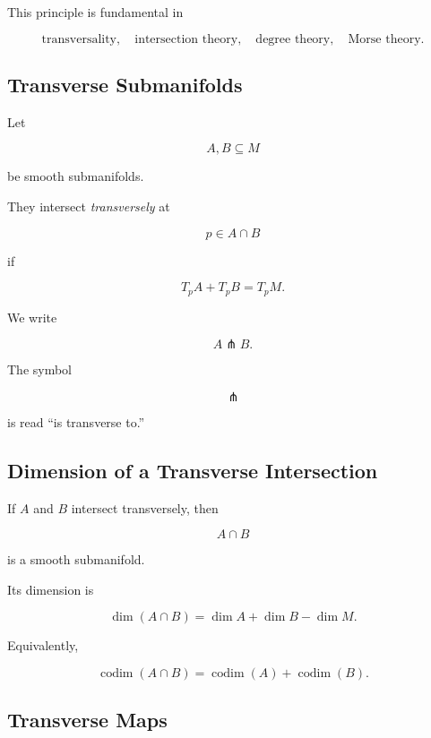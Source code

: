 This principle is fundamental in

\[
\boxed{
\text{transversality},
\quad
\text{intersection theory},
\quad
\text{degree theory},
\quad
\text{Morse theory}.
}
\]

\subsection{Transverse Submanifolds}
\label{subsec:transverse-submanifolds}

Let

\[
A,B\subseteq M
\]

be smooth submanifolds.

They intersect \emph{transversely} at

\[
p\in A\cap B
\]

if

\[
\boxed{
T_pA+T_pB=T_pM.
}
\]

We write

\[
\boxed{
A\pitchfork B.
}
\]

The symbol

\[
\pitchfork
\]

is read ``is transverse to.''

\subsection{Dimension of a Transverse Intersection}
\label{subsec:dimension-transverse-intersection}

If \(A\) and \(B\) intersect transversely, then

\[
A\cap B
\]

is a smooth submanifold.

Its dimension is

\[
\boxed{
\dim(A\cap B)
=
\dim A+\dim B-\dim M.
}
\]

Equivalently,

\[
\boxed{
\operatorname{codim}(A\cap B)
=
\operatorname{codim}(A)
+
\operatorname{codim}(B).
}
\]

\subsection{Transverse Maps}
\label{subsec:transverse-maps}

